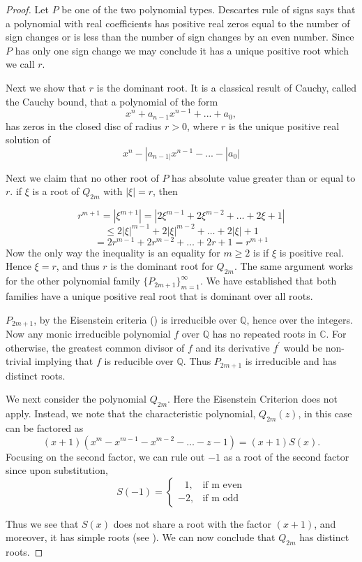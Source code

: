 \documentclass[11pt]{amsart}
\numberwithin{equation}{section}
\theoremstyle{plain}
\begin{document}
\begin{proof}  Let $P$ be one of the two  polynomial types. 
Descartes rule of signs says that  
a  polynomial  with 
  real coefficients has positive real zeros equal to the number of sign changes  or is less than the number of sign changes  by an even number.  Since  $P$  has only one sign change we may conclude it has a unique positive root which we call $r$.
  
Next we show that $r$ is the dominant root.  It is a classical result  of Cauchy, called the Cauchy bound, that a polynomial 
of the form 
$$
x^{n} +a_{n-1}x^{n-1}+...+a_{0}, 
$$
has zeros in the closed disc of radius $r >0$, where $r$ is the unique positive real solution of 
$$
x^{n}- |a_{n-1|}x^{n-1}-...-|a_{0}|
$$

Next we claim that no other root of $P$ has absolute value greater than or equal to $r$.  if  $\xi$ is  a root of $ Q_{2m}$ with $|\xi|=r$, then 


$$
r^{m+1}=|\xi^{m+1}|=|2\xi^{m-1} +2\xi^{m-2}+\dots +2\xi+1|
$$
$$
\leq  2|\xi|^{m-1} +2|\xi|^{m-2}+\dots +2|\xi|+1    
$$
$$
= 2r^{m-1} +2r^{m-2}+\dots +2r+1=r^{m+1}
$$
Now the only way the  inequality is an equality  for $m \geq 2$ is if 
$\xi$ is  positive real. Hence $\xi=r$, and thus $r$ is the dominant root for $Q_{2m}$.
The same argument works for the other  polynomial family
$\{P_{2m+1} \}_{m=1}^{\infty}$.  We have established that both families have a unique positive real root that is dominant over all roots. 

$P_{2m+1}$, by  the Eisenstein criteria (\cite{B-J-N}) is irreducible  over 
$\mathbb{Q}$, hence  over the integers. 
  Now any  monic irreducible  polynomial  $f$ over 
  $\mathbb{Q}$  has no repeated roots in $\mathbb{C}$. For otherwise, the greatest common divisor  of $f$ and  its derivative $f^{\prime}$ would be  non-trivial implying that $f$ is reducible over $\mathbb{Q}$. Thus 
  $P_{2m+1}$ is irreducible and has distinct roots. 
  
  
We next consider the polynomial $Q_{2m}$. Here  the Eisenstein  Criterion does not apply.  Instead, we note  that the  characteristic polynomial, $Q_{2m}(z)$,  in this case can be factored as 
$$
(x+1)(x^{m} - x^{m-1} - x^{m-2}- \dots -z -1)=(x+1)S(x). 
$$
Focusing  on the second factor,   we can  rule out $-1$ as a root of the second factor since   upon substitution, 
\begin{equation}
S(-1)=
 \begin{cases}
   \text{    } 1,   & \text{if m even} \\
    -2,  & \text{if m odd}
\end{cases}
\end{equation}

Thus we see that $S(x)$  does not share a root with  the factor $(x+1)$, and  moreover, it has  simple roots  (see \cite{Wol}).  We can now  conclude that $Q_{2m}$  has distinct  roots.  
\end{proof}
\end{document}
